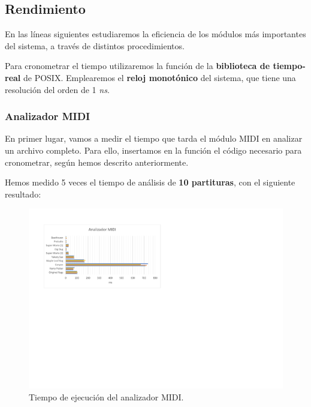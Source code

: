 \smallskip

\subsection{Rendimiento}

En las líneas siguientes estudiaremos la eficiencia de los módulos más importantes del sistema, a través de distintos procedimientos.

Para cronometrar el tiempo utilizaremos la función  de la \textbf{biblioteca de tiempo-real} de \acrshort{POSIX}. Emplearemos el \textbf{reloj monotónico} del sistema, que tiene una resolución del orden de 1 \textit{ns}.

\subsubsection{Analizador MIDI}

En primer lugar, vamos a medir el tiempo que tarda el módulo \acrshort{MIDI} en analizar un archivo completo. Para ello, insertamos en la función  el código necesario para cronometrar, según hemos descrito anteriormente.

Hemos medido 5 veces el tiempo de análisis de \textbf{10 partituras}, con el siguiente resultado:

\smallskip

\begin{figure}[H]
	\noindent \begin{centering}
		\includegraphics[width=\linewidth*3/4]{capitulo6/lat_midi}
		\par\end{centering}
	\smallskip
	\caption{\label{fig:lat_midi} Tiempo de ejecución del analizador MIDI.}
\end{figure} 

